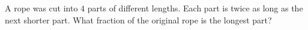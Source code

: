 A rope was cut into $4$ parts of different lengths. Each part is twice as long as the next shorter part. What fraction of the original rope is the longest part?
